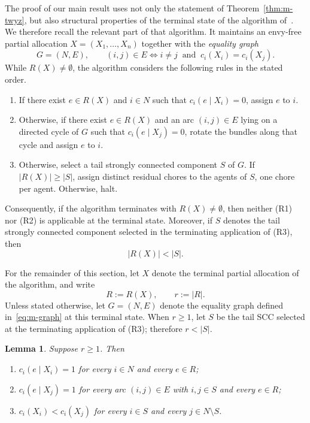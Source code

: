 \documentclass[11pt]{article}
\theoremstyle{plain}
\newtheorem{lemma}{Lemma}
\theoremstyle{plain}
\newcommand{\agents}{N}                       %
\newcommand{\cost}{c}
\newcommand{\abs}[1]{\left\lvert#1\right\rvert}
\begin{document}
The proof of our main result uses not only the statement of Theorem~\ref{thm:m-twyz}, but also structural properties of the terminal state of the algorithm of~\cite{tao2025existence}. We therefore recall the relevant part of that algorithm. It maintains an envy-free partial allocation $X=(X_1,\dots,X_n)$ together with the \emph{equality graph}
\begin{equation}
\label{eq:m-graph}
  G=(\agents,E),
  \qquad
  (i,j)\in E
  \iff
  i\ne j \ \text{ and }\ \cost_i(X_i)=\cost_i(X_j).
\end{equation}
While $R(X)\ne\emptyset$, the algorithm considers the following rules in the stated order.
\begin{enumerate}
  \item[(R1)] If there exist $e\in R(X)$ and $i\in\agents$ such that
        $\cost_i(e\mid X_i)=0$, assign $e$ to $i$.

  \item[(R2)] Otherwise, if there exist $e\in R(X)$ and an arc      $(i,j)\in E$ lying on a directed cycle of $G$ such that $\cost_i(e\mid X_j)=0$, rotate the bundles along that cycle and assign $e$ to $i$.

 \item[(R3)] Otherwise, select a tail strongly connected component $S$ of $G$. If $\abs{R(X)}\geq\abs S$, assign distinct residual chores to the agents of $S$, one chore per agent. Otherwise, halt. \end{enumerate}           Consequently, if the algorithm terminates with \(R(X)\neq\emptyset\), then neither (R1) nor (R2) is applicable at the terminal state. Moreover, if \(S\) denotes the tail strongly connected component selected in the terminating application of (R3), then
\[
    \abs{R(X)}<\abs S.
\]



For the remainder of this section, let $X$ denote the terminal partial allocation of the algorithm, and write
\[
    R:=R(X), \qquad r:=\abs R.
\]
Unless stated otherwise, let $G=(\agents,E)$ denote the equality graph defined in~\eqref{eq:m-graph} at this terminal state. When \(r\ge1\), let \(S\) be the tail SCC selected at the terminating application of (R3); therefore \(r<|S|\).


\begin{lemma}
\label{lem:m-terminal}
Suppose $r \ge 1$. Then
\begin{enumerate}
  \item[(i)] $\cost_i(e \mid X_i) = 1$ for every $i \in \agents$ and every $e \in R$;
  \item[(ii)] $\cost_i(e \mid X_j) = 1$ for every arc $(i,j) \in E$ with  $i,j \in S$ and every $e \in R$;
  \item[(iii)] $\cost_i(X_i) < \cost_i(X_j)$ for every $i \in S$ and every $j \in \agents \setminus S$.
\end{enumerate}
\end{lemma}
\end{document}

